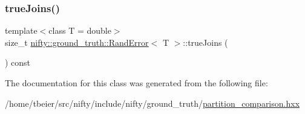 \subsubsection{\texorpdfstring{true\+Joins()}{trueJoins()}}
{\footnotesize\ttfamily template$<$class T  = double$>$ \\
size\+\_\+t \hyperlink{classnifty_1_1ground__truth_1_1RandError}{nifty\+::ground\+\_\+truth\+::\+Rand\+Error}$<$ T $>$\+::true\+Joins (\begin{DoxyParamCaption}{ }\end{DoxyParamCaption}) const\hspace{0.3cm}{\ttfamily [inline]}}



The documentation for this class was generated from the following file\+:\begin{DoxyCompactItemize}
\item 
/home/tbeier/src/nifty/include/nifty/ground\+\_\+truth/\hyperlink{partition__comparison_8hxx}{partition\+\_\+comparison.\+hxx}\end{DoxyCompactItemize}
